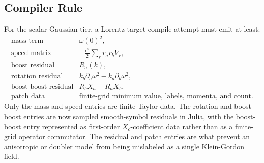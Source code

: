 \subsection{Compiler Rule}

For the scalar Gaussian tier, a Lorentz-target compile attempt must emit at
least:
\[
\begin{array}{ll}
\text{mass term} & \omega(0)^2,\\
\text{speed matrix} &
  -\frac{\epsilon^2}{2}\sum_r r_ar_bV_r,\\
\text{boost residual} & R_a(k),\\
\text{rotation residual} &
  k_b\partial_a\omega^2-k_a\partial_b\omega^2,\\
\text{boost-boost residual} & R_bX_a-R_aX_b,\\
\text{patch data} &
  \text{finite-grid minimum value, labels, momenta, and count}.
\end{array}
\]
Only the mass and speed entries are finite Taylor data.  The rotation and
boost-boost entries are now sampled smooth-symbol residuals in Julia, with the
boost-boost entry represented as first-order \(X_c\)-coefficient data rather
than as a finite-grid operator commutator.  The residual and patch entries are
what prevent an anisotropic or doubler model from being mislabeled as a single
Klein-Gordon field.
